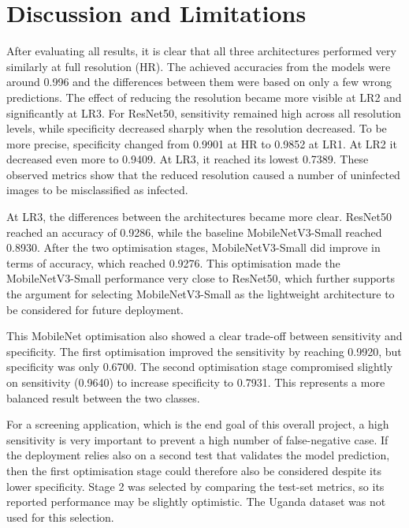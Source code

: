 \section{Discussion and Limitations}

After evaluating all results, it is clear that all three architectures performed very similarly at full resolution (HR). The achieved accuracies from the models were around 0.996 and the differences between them were based on only a few wrong predictions. The effect of reducing the resolution became more visible at LR2 and significantly at LR3. For ResNet50, sensitivity remained high across all resolution levels, while specificity decreased sharply when the resolution decreased. To be more precise, specificity changed from 0.9901 at HR to 0.9852 at LR1. At LR2 it decreased even more to 0.9409. At LR3, it reached its lowest 0.7389. These observed metrics show that the reduced resolution caused a number of uninfected images to be misclassified as infected.

At LR3, the differences between the architectures became more clear. ResNet50 reached an accuracy of 0.9286, while the baseline MobileNetV3-Small reached 0.8930. After the two optimisation stages, MobileNetV3-Small did improve in terms of accuracy, which reached 0.9276.  This optimisation made the MobileNetV3-Small performance very close to ResNet50, which further supports the argument for selecting MobileNetV3-Small as the lightweight architecture to be considered for future deployment.

This MobileNet optimisation also showed a clear trade-off between sensitivity and specificity. The first optimisation improved the sensitivity by reaching 0.9920, but specificity was only 0.6700. The second optimisation stage compromised slightly on sensitivity (0.9640) to increase specificity to 0.7931. This represents a more balanced result between the two classes. 

For a screening application, which is the end goal of this overall project, a high sensitivity is very important to prevent a high number of false-negative case. If the deployment relies also on a second test that validates the model prediction, then the first optimisation stage could therefore also be considered despite its lower specificity. Stage 2 was selected by comparing the test-set metrics, so its reported performance may be slightly optimistic. The Uganda dataset was not used for this selection.

